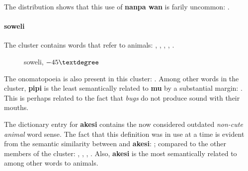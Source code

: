 \documentclass[14pt, a4paper]{extreport}
\makeatletter
\DeclareRobustCommand\ttfamily
        {\not@math@alphabet\ttfamily\mathtt
         \fontfamily\ttdefault\small\selectfont}
\makeatother
\begin{document}
The distribution shows that this use of \textbf{nanpa wan} is farily uncommon: .
        \paragraph{soweli}
The cluster  contains words that refer to animals: , , , , .

\begin{figure}[ht]%
  \def\angle{-45}
  \bigskip
  \centering
  \caption{soweli, \(\angle\textdegree\)}
\end{figure}%

The onomatopoeia  is also present in this cluster: . Among other words in the cluster, \textbf{pipi} is the least semantically related to \textbf{mu} by a substantial margin: . This is perhaps related to the fact that \textit{bugs} do not produce sound with their mouths.

The dictionary entry for \textbf{akesi} contains the now considered outdated \textit{non-cute animal} word sense. The fact that this definition was in use at a time is evident from the semantic similarity between  and \textbf{akesi}: ; compared to the other members of the cluster: , , , . Also, \textbf{akesi} is the most semantically related to  among other words to animals.
\end{document}
